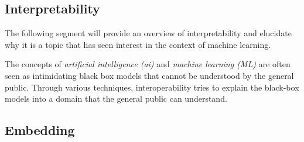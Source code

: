 \subsection{Interpretability}
The following segment will provide an overview of interpretability and elucidate why it is a topic that has seen interest in the context of machine learning.

The concepts of \textit{artificial intelligence (ai)} and \textit{machine learning (ML)} are often seen as intimidating black box models that cannot be understood by the general public. Through various techniques, interoperability tries to explain the black-box models into a domain that the general public can understand.


\subsection{Embedding}